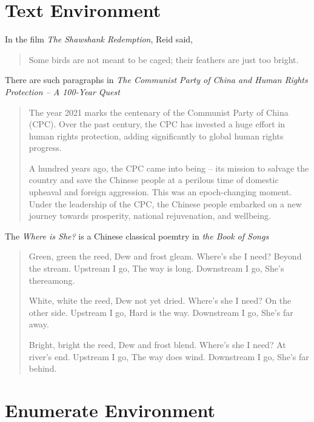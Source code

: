 \documentclass{article}
\begin{document}
    \section{Text Environment} 
        In the film \textit{The Shawshank Redemption}, Reid said, 
        \begin{quote}           %
            Some birds are not meant to be caged; their feathers are just too bright. 
        \end{quote}
        There are such paragraphs in \textit{The Communist Party of China and Human Rights Protection -- A 100-Year Quest}
        \begin{quotation}       %
            The year 2021 marks the centenary of the Communist Party of China (CPC). 
            Over the past century, the CPC has invested a huge effort in human rights 
            protection, adding significantly to global human rights progress.

            A hundred years ago, the CPC came into being – its mission to salvage the 
            country and save the Chinese people at a perilous time of domestic upheaval 
            and foreign aggression. This was an epoch-changing moment. Under the leadership 
            of the CPC, the Chinese people embarked on a new journey towards prosperity, 
            national rejuvenation, and wellbeing.
        \end{quotation}
        The \textit{Where is She?} is a Chinese classical poemtry in \textit{the Book of Songs}
        \begin{verse}
            Green, green the reed,
            Dew and frost gleam.
            Where’s she I need?
            Beyond the stream.
            Upstream I go,
            The way is long.
            Downstream I go,
            She’s thereamong.
            
            White, white the reed,
            Dew not yet dried.
            Where’s she I need?
            On the other side.
            Upstream I go,
            Hard is the way.
            Downstream I go,
            She’s far away.
            
            Bright, bright the reed,
            Dew and frost blend.
            Where’s she I need?
            At river’s end.
            Upstream I go,
            The way does wind.
            Downstream I go,
            She’s far behind.
        \end{verse}
    
    \section{Enumerate Environment}
\end{document}
